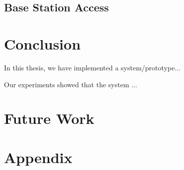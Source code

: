 \documentclass[USenglish]{uit-thesis}
\begin{document}
\section{Base Station Access}

\chapter{Conclusion}
In this thesis, we have implemented a system/prototype...

Our experiments showed that the system ...
\chapter{Future Work}

\chapter{Appendix}


\backmatter


\newpage{}
\end{document}

